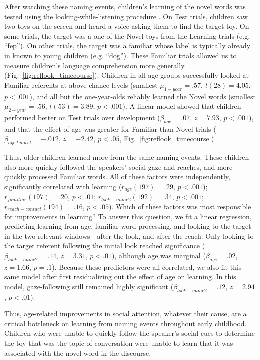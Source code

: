 \documentclass{pnastwo}
\begin{document}
\begin{article}
After watching these naming events, children's learning of the novel words was tested using the looking-while-listening procedure \citep{fernald1998, fernald2008}. On Test trials, children saw two toys on the screen and heard a voice asking them to find the target toy. On some trials, the target was a one of the Novel toys from the Learning trials (e.g. ``fep''). On other trials, the target was a familiar whose label is typically already in known to young children (e.g. ``dog''). These Familiar trials allowed us to measure children's language comprehension more generally (Fig.~\ref{fig:reflook_timecourse}). Children in all age groups successfully looked at Familiar referents at above chance levels (smallest $\mu_{1-year} = .57$, $t(28) = 4.05$, $p < .001$), and all but the one-year-olds reliably learned the Novel words (smallest $\mu_{2-year} = .56$, $t(53) = 3.89$, $p < .001$). A linear model showed that children performed better on Test trials over development ($\beta_{age} = .07$, $z = 7.93$, $p < .001$), and that the effect of age was greater for Familiar than Novel trials ($\beta_{age * novel} = -.012$, $z = -2.42$, $p < .05$, Fig.~\ref{fig:reflook_timecourse})

Thus, older children learned more from the same naming events. These children also more quickly followed the speakers' social gaze and reaches, and more quickly processed Familiar words. All of these factors were independently, significantly correlated with learning ($r_{age}(197) = .29$, $p < .001$); $r_{familiar}(197) = .20$, $p < .01$; $r_{look-name2}(192) = .34$, $p < .001$; $r_{reach-contact}(194) = .16$, $p < .05$). Which of these factors was most responsible for improvements in learning? To answer this question, we fit a linear regression, predicting learning from age, familiar word processing, and looking to the target in the two relevant windows---after the look, and after the reach. Only looking to the target referent following the initial look reached significance ($\beta_{look-name2} = .14$, $z = 3.31$, $p < .01$), although age was marginal ($\beta_{age} = .02$, $z = 1.66$, $p = .1$). Because these predictors were all correlated, we also fit this same model after first residualizing out the effect of age on learning. In this model, gaze-following still remained highly significant ($\beta_{look-name2} = .12$, $z = 2.94$, $p < .01$).

Thus, age-related improvements in social attention, whatever their cause, are a critical bottleneck on learning from naming events throughout early childhood. Children who were unable to quickly follow the speaker's social cues to determine the toy that was the topic of conversation were unable to learn that it was associated with the novel word in the discourse.


\end{article}
\end{document}
